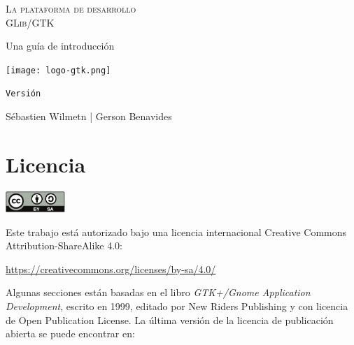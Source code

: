 \begin{titlepage}
    \begin{center}
        \afterpage{\restorepagecolor}
        
        \vspace*{0.64cm}
        
        \textsc{
            \Huge La plataforma de desarrollo\\[0.32cm]
            GLib/GTK
        }
        
        \vspace{0.64cm}
        
        \textrm{\Large Una guía de introducción}
        
        \vspace{1.28cm}
        
        \texttt{[image: logo-gtk.png]}
        
        \vspace{1.92cm}

        \texttt{\large Versión \bookversion}

        \vfill
            
        {\large Sébastien Wilmetn | Gerson Benavides}
    \end{center}
\end{titlepage}

\mbox{}

\vfill

\section{Licencia}
    \label{intro-license}
    
    \begin{center}
        \includegraphics[height=0.8cm]{assets/img/creative-commons.pdf}
    \end{center}
    
    Este trabajo está autorizado bajo una licencia internacional Creative Commons Attribution-ShareAlike 4.0:
    
    \url{https://creativecommons.org/licenses/by-sa/4.0/}
    
    \vspace{0.16cm}
    
    Algunas secciones están basadas en el libro \emph{GTK+/Gnome Application Development}, escrito en 1999, editado por New Riders Publishing y con licencia de Open Publication License. La última versión de la licencia de publicación abierta se puede encontrar en:
    
